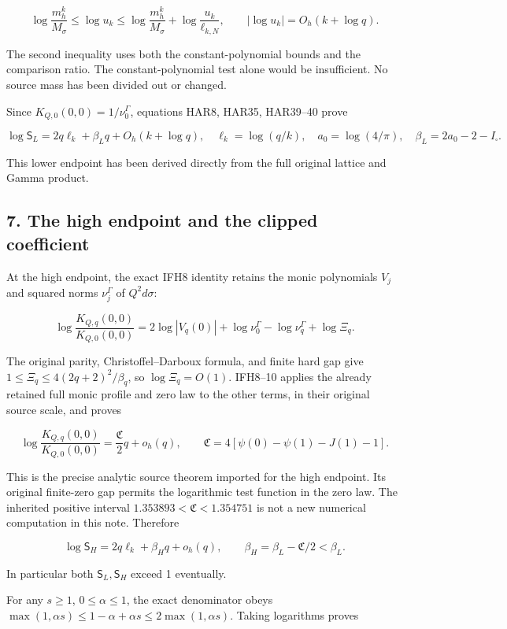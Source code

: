 \documentclass[11pt]{article}
\begin{document}
\[
\log\frac{m_h^k}{M_\sigma}
\le\log u_k
\le\log\frac{m_h^k}{M_\sigma}
+\log\frac{u_k}{\ell_{k,N}},
\qquad |\log u_k|=O_h(k+\log q).
\tag{HAR40}
\]

The second inequality uses both the constant-polynomial bounds and the comparison ratio. The constant-polynomial test alone would be insufficient. No source mass has been divided out or changed.

Since \(K_{Q,0}(0,0)=1/\nu_0^\Gamma\), equations HAR8, HAR35, HAR39--40 prove

\[
\log\mathsf S_L=2q\ell_k+\beta_Lq+O_h(k+\log q),
\quad \ell_k=\log(q/k),
\quad a_0=\log(4/\pi),
\quad\beta_L=2a_0-2-I_\square.
\tag{HAR41}
\]

This lower endpoint has been derived directly from the full original lattice and Gamma product.

\subsection{7. The high endpoint and the clipped coefficient}\label{the-high-endpoint-and-the-clipped-coefficient}

At the high endpoint, the exact IFH8 identity retains the monic polynomials \(V_j\) and squared norms \(\nu_j^\Gamma\) of \(Q^2d\sigma\):

\[
\log\frac{K_{Q,q}(0,0)}{K_{Q,0}(0,0)}
=2\log|V_q(0)|+\log\nu_0^\Gamma-\log\nu_q^\Gamma+\log\Xi_q.
\tag{HAR42}
\]

The original parity, Christoffel--Darboux formula, and finite hard gap give \(1\le\Xi_q\le4(2q+2)^2/\beta_q\), so \(\log\Xi_q=O(1)\). IFH8--10 applies the already retained full monic profile and zero law to the other terms, in their original source scale, and proves

\[
\log\frac{K_{Q,q}(0,0)}{K_{Q,0}(0,0)}
=\frac{\mathfrak C}{2}q+o_h(q),
\qquad
\mathfrak C=4[\psi(0)-\psi(1)-J(1)-1].
\tag{HAR43}
\]

This is the precise analytic source theorem imported for the high endpoint. Its original finite-zero gap permits the logarithmic test function in the zero law. The inherited positive interval \(1.353893<\mathfrak C<1.354751\) is not a new numerical computation in this note. Therefore

\[
\log\mathsf S_H=2q\ell_k+\beta_Hq+o_h(q),
\qquad\beta_H=\beta_L-\mathfrak C/2<\beta_L.
\tag{HAR44}
\]

In particular both \(\mathsf S_L,\mathsf S_H\) exceed 1 eventually.

For any \(s\ge1\), \(0\le\alpha\le1\), the exact denominator obeys \(\max(1,\alpha s)\le1-\alpha+\alpha s\le2\max(1,\alpha s)\). Taking logarithms proves
\end{document}
